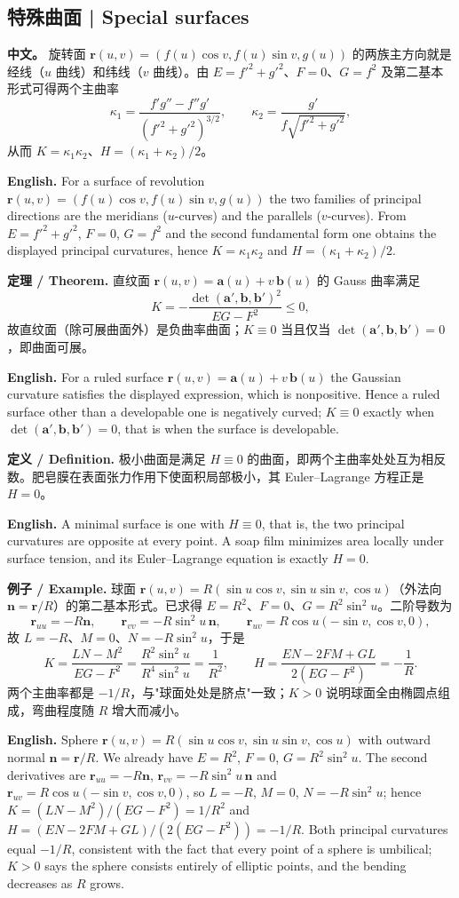 \documentclass[UTF8,11pt,a4paper]{ctexart}
\newcommand{\APS}[2]{\par\noindent\textbf{中文。} #1\par\noindent\textbf{English.} #2\par\smallskip}
\newcommand{\EN}[1]{\par\noindent \textbf{English.} #1\par}
\newcommand{\EX}[2]{\par\noindent \textbf{例子 / Example.} #1\par\EN{#2}}
\newcommand{\DEF}[2]{\par\noindent\textbf{定义 / Definition.} #1\par\EN{#2}\par\smallskip}
\newcommand{\THM}[2]{\par\noindent\textbf{定理 / Theorem.} #1\par\EN{#2}\par\smallskip}
\newcommand{\br}{\mathbf{r}}
\newcommand{\bn}{\mathbf{n}}
\newcommand{\ba}{\mathbf{a}}
\newcommand{\bb}{\mathbf{b}}
\begin{document}
\subsection{特殊曲面 | Special surfaces}
\APS{旋转面 $\br(u,v)=(f(u)\cos v,f(u)\sin v,g(u))$ 的两族主方向就是经线（$u$ 曲线）和纬线（$v$ 曲线）。由 $E=f'^2+g'^2$、$F=0$、$G=f^2$ 及第二基本形式可得两个主曲率
\[
\kappa_1=\frac{f'g''-f''g'}{(f'^2+g'^2)^{3/2}},\qquad
\kappa_2=\frac{g'}{f\sqrt{f'^2+g'^2}},
\]
从而 $K=\kappa_1\kappa_2$、$H=(\kappa_1+\kappa_2)/2$。}{For a surface of revolution $\br(u,v)=(f(u)\cos v,f(u)\sin v,g(u))$ the two families of principal directions are the meridians ($u$-curves) and the parallels ($v$-curves). From $E=f'^2+g'^2$, $F=0$, $G=f^2$ and the second fundamental form one obtains the displayed principal curvatures, hence $K=\kappa_1\kappa_2$ and $H=(\kappa_1+\kappa_2)/2$.}
\THM{直纹面 $\br(u,v)=\ba(u)+v\,\bb(u)$ 的 Gauss 曲率满足
\[
K=-\frac{\det(\ba',\bb,\bb')^2}{EG-F^2}\le0 ,
\]
故直纹面（除可展曲面外）是负曲率曲面；$K\equiv0$ 当且仅当 $\det(\ba',\bb,\bb')=0$，即曲面可展。}{For a ruled surface $\br(u,v)=\ba(u)+v\,\bb(u)$ the Gaussian curvature satisfies the displayed expression, which is nonpositive. Hence a ruled surface other than a developable one is negatively curved; $K\equiv0$ exactly when $\det(\ba',\bb,\bb')=0$, that is when the surface is developable.}
\DEF{极小曲面是满足 $H\equiv0$ 的曲面，即两个主曲率处处互为相反数。肥皂膜在表面张力作用下使面积局部极小，其 Euler--Lagrange 方程正是 $H=0$。}{A minimal surface is one with $H\equiv0$, that is, the two principal curvatures are opposite at every point. A soap film minimizes area locally under surface tension, and its Euler--Lagrange equation is exactly $H=0$.}
\EX{球面 $\br(u,v)=R(\sin u\cos v,\sin u\sin v,\cos u)$（外法向 $\bn=\br/R$）的第二基本形式。已求得 $E=R^2$、$F=0$、$G=R^2\sin^2u$。二阶导数为
\[
\br_{uu}=-R\bn,\qquad
\br_{vv}=-R\sin^2u\,\bn,\qquad
\br_{uv}=R\cos u(-\sin v,\cos v,0),
\]
故 $L=-R$、$M=0$、$N=-R\sin^2u$，于是
\[
K=\frac{LN-M^2}{EG-F^2}=\frac{R^2\sin^2u}{R^4\sin^2u}=\frac{1}{R^2},\qquad
H=\frac{EN-2FM+GL}{2(EG-F^2)}=-\frac1R .
\]
两个主曲率都是 $-1/R$，与"球面处处是脐点"一致；$K>0$ 说明球面全由椭圆点组成，弯曲程度随 $R$ 增大而减小。}{Sphere $\br(u,v)=R(\sin u\cos v,\sin u\sin v,\cos u)$ with outward normal $\bn=\br/R$. We already have $E=R^2$, $F=0$, $G=R^2\sin^2u$. The second derivatives are $\br_{uu}=-R\bn$, $\br_{vv}=-R\sin^2u\,\bn$ and $\br_{uv}=R\cos u(-\sin v,\cos v,0)$, so $L=-R$, $M=0$, $N=-R\sin^2u$; hence $K=(LN-M^2)/(EG-F^2)=1/R^2$ and $H=(EN-2FM+GL)/(2(EG-F^2))=-1/R$. Both principal curvatures equal $-1/R$, consistent with the fact that every point of a sphere is umbilical; $K>0$ says the sphere consists entirely of elliptic points, and the bending decreases as $R$ grows.}
\end{document}
